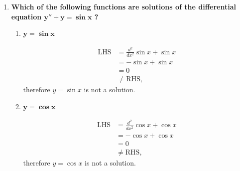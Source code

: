 \documentclass[12pt]{article}
\begin{document}
\begin{enumerate}
\begin{enumerate}
                    Again substituting for $y$,
                    \begin{align*}
                        \text{LHS} & = (a r_1^2 e^{r_1 x} + b r_2^2 e^{r_2 x}) + (a r_1 e^{r_1 x} + b r_2 e^{r_2 x}) - (a e^{r_1 x} + b e^{r_2 x}) \\
                                   & = (a r_1^2 e^{r_1 x} + a r_1 e^{r_1 x} - a e^{r_1 x}) + (b r_2^2 e^{r_2 x} + b r_2 e^{r_2 x} - b e^{r_2 x})   \\
                                   & = a (r_1^2 e^{r_1 x} + r_1 e^{r_1 x} - e^{r_1 x}) + b (r_2^2 e^{r_2 x} + r_2 e^{r_2 x} - e^{r_2 x})           \\
                                   & = 0 + 0                                                                                                       \\
                                   & = \text{RHS}.
                    \end{align*}
                    Hence every member of the family of functions $y = a e^{r_1 x} + b e^{r_2 x}$ is a solution to the differential equation.
          \end{enumerate}

    \item \textbf{Which of the following functions are solutions of the differential equation $\bm{y'' + y = \sin x}$ ?}
          \begin{enumerate}
              \item $\bm{y = \sin x}$

                    \begin{align*}
                        \text{LHS} & = \frac{d^2}{dx^2} \sin x + \sin x \\
                                   & = -\sin x + \sin x                 \\
                                   & = 0                                \\
                                   & \neq \text{RHS},
                    \end{align*}
                    therefore $y = \sin x$ is not a solution. \medskip

              \item $\bm{y = \cos x}$

                    \begin{align*}
                        \text{LHS} & = \frac{d^2}{dx^2} \cos x + \cos x \\
                                   & = -\cos x + \cos x                 \\
                                   & = 0                                \\
                                   & \neq \text{RHS},
                    \end{align*}
                    therefore $y = \cos x$ is not a solution. \medskip


\end{enumerate}
\end{enumerate}
\end{document}

